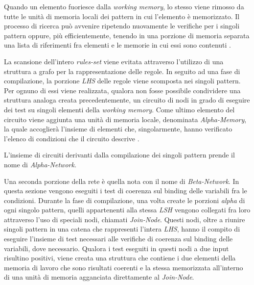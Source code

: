Quando un elemento fuoriesce dalla \emph{working memory}, lo stesso viene rimosso da tutte le unità di memoria locali dei pattern in cui l'elemento è memorizzato. Il processo di ricerca può avvenire ripetendo nuovamente le verifiche per i singoli pattern \cite{forgy1982} oppure, più efficientemente, tenendo in una porzione di memoria separata una lista di riferimenti fra elementi e le memorie in cui essi sono contenuti \cite{Doorenbos95productionmatching}.

La scansione dell'intero \emph{rules-set} viene evitata attraverso l'utilizzo di una struttura a grafo per la rappresentazione delle regole. In seguito ad una fase di compilazione, la porzione \emph{LHS} delle regole viene scomposta nei singoli pattern. Per ognuno di essi viene realizzata, qualora non fosse possibile condividere una struttura analoga creata precedentemente, un circuito di nodi in grado di eseguire dei test su singoli elementi della \emph{working memory}. Come ultimo elemento del circuito viene aggiunta una unità di memoria locale, denominata \emph{Alpha-Memory}, la quale accoglierà l'insieme di elementi che, singolarmente, hanno verificato l'elenco di condizioni che il circuito descrive \cite{Doorenbos95productionmatching}.

L'insieme di circuiti derivanti dalla compilazione dei singoli pattern prende il nome di \emph{Alpha-Network}.

Una seconda porzione della rete è quella nota con il nome di \emph{Beta-Network}. In questa sezione vengono eseguiti i test di coerenza sul binding delle variabili fra le condizioni. Durante la fase di compilazione, una volta create le porzioni \emph{alpha} di ogni singolo pattern, quelli appartenenti alla stessa \emph{LSH} vengono collegati fra loro attraverso l'uso di speciali nodi, chiamati \emph{Join-Node}. Questi nodi, oltre a riunire singoli pattern in una catena che rappresenti l'intera \emph{LHS}, hanno il compito di eseguire l'insieme di test necessari alle verifiche di coerenza sul binding delle variabili, dove necessario. Qualora i test eseguiti in questi nodi a due input risultino positivi, viene creata una struttura che contiene i due elementi della memoria di lavoro che sono risultati coerenti e la stessa memorizzata all'interno di una unità di memoria agganciata direttamente al \emph{Join-Node}. 

